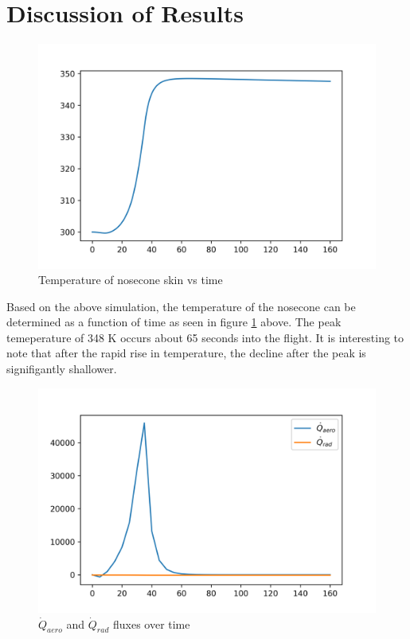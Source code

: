 \documentclass[twocolumn]{article}
\begin{document}
        \section{Discussion of Results}

            \begin{figure}[h]
                \label{fig:temptime}
                \includegraphics[width=\linewidth]{tempprofile.png}
                \caption{Temperature of nosecone skin vs time}
            \end{figure}

            Based on the above simulation, the temperature of the nosecone can
            be determined as a function of time as seen in figure 
            \ref{fig:temptime} above. The peak temeperature of 348 K occurs
            about 65 seconds into the flight. It is interesting to note that 
            after the rapid rise in temperature, the decline after the peak is 
            signifigantly shallower. 
                         

            \begin{figure}[h]
                \label{fig:flux}
                \includegraphics[width=\linewidth]{flux.png}
                \caption{$\dot{Q}_{aero}$ and $\dot{Q}_{rad}$ fluxes over time}
            \end{figure}
\end{document}
